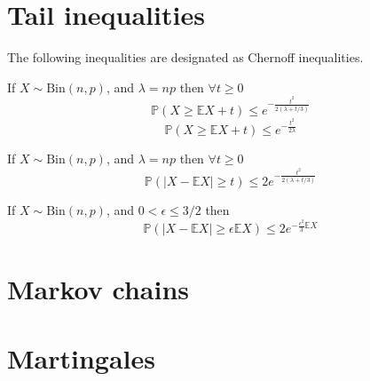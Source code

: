 \section{Tail inequalities}
The following inequalities are designated as Chernoff inequalities.
\begin{theorem}\label{chernoff1}
	If $X \sim \text{Bin}(n, p)$, and $\lambda = np$ then $\forall t \geq 0$
	\begin{equation}
		\mathbb{P}( X \geq \mathbb{E}X + t) \leq e^{-\frac{t^2}{2(\lambda + t/3)}}
	\end{equation}
	\begin{equation}
		\mathbb{P}( X \geq \mathbb{E}X + t) \leq e^{-\frac{t^2}{2\lambda}}
	\end{equation}
\end{theorem}
\begin{corollary}\label{chernoff2}
	If $X \sim \text{Bin}(n, p)$, and $\lambda = np$ then $\forall t \geq 0$
	\begin{equation}
		\mathbb{P}( |X - \mathbb{E}X| \geq t) \leq 2e^{-\frac{t^2}{2(\lambda + t/3)}}
	\end{equation}
\end{corollary}
\begin{corollary}\label{chernoff3}
	If $X \sim \text{Bin}(n, p)$, and $0<\epsilon \leq 3/2$ then
	\begin{equation}
		\mathbb{P}( |X - \mathbb{E}X| \geq \epsilon \mathbb{E}X) \leq 2e^{-\frac{\epsilon^2}{3}\mathbb{E}X }
	\end{equation}
\end{corollary}
\begin{theorem}\label{binomTail}

\end{theorem}

\section{Markov chains}
\section{Martingales}
